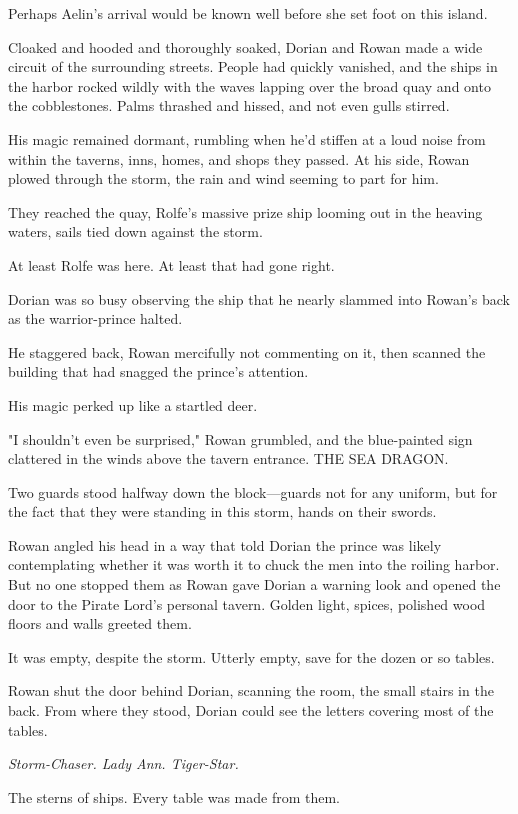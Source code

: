 Perhaps Aelin's arrival would be known well before she set foot on this island.

Cloaked and hooded and thoroughly soaked, Dorian and Rowan made a wide circuit of the surrounding streets.
People had quickly vanished, and the ships in the harbor rocked wildly with the waves lapping over the broad quay and onto the cobblestones.
Palms thrashed and hissed, and not even gulls stirred.

His magic remained dormant, rumbling when he'd stiffen at a loud noise from within the taverns, inns, homes, and shops they passed.
At his side, Rowan plowed through the storm, the rain and wind seeming to part for him.

They reached the quay, Rolfe's massive prize ship looming out in the heaving waters, sails tied down against the storm.

At least Rolfe was here.
At least that had gone right.

Dorian was so busy observing the ship that he nearly slammed into Rowan's back as the warrior-prince halted.

He staggered back, Rowan mercifully not commenting on it, then scanned the building that had snagged the prince's attention.

His magic perked up like a startled deer.

"I shouldn't even be surprised," Rowan grumbled, and the blue-painted sign clattered in the winds above the tavern entrance.
THE SEA DRAGON.

Two guards stood halfway down the block---guards not for any uniform, but for the fact that they were standing in this storm, hands on their swords.

Rowan angled his head in a way that told Dorian the prince was likely contemplating whether it was worth it to chuck the men into the roiling harbor.
But no one stopped them as Rowan gave Dorian a warning look and opened the door to the Pirate Lord's personal tavern.
Golden light, spices, polished wood floors and walls greeted them.

It was empty, despite the storm.
Utterly empty, save for the dozen or so tables.

Rowan shut the door behind Dorian, scanning the room, the small stairs in the back.
From where they stood, Dorian could see the letters covering most of the tables.

\emph{Storm-Chaser.
Lady Ann.
Tiger-Star.}

The sterns of ships.
Every table was made from them.

